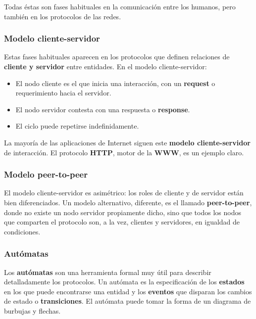 \documentclass[spanish,a4paper,]{article}
\providecommand{\tightlist}{%
  \setlength{\itemsep}{0pt}\setlength{\parskip}{0pt}}
\begin{document}
Todas éstas son fases habituales en la comunicación entre los humanos,
pero también en los protocolos de las redes.

\hypertarget{modelo-cliente-servidor}{%
\subsubsection{Modelo cliente-servidor}\label{modelo-cliente-servidor}}

Estas fases habituales aparecen en los protocolos que definen relaciones
de \textbf{cliente y servidor} entre entidades. En el modelo
cliente-servidor:

\begin{itemize}
\tightlist
\item
  El nodo cliente es el que inicia una interacción, con un
  \textbf{request} o requerimiento hacia el servidor.
\item
  El nodo servidor contesta con una respuesta o \textbf{response}.
\item
  El ciclo puede repetirse indefinidamente.
\end{itemize}

La mayoría de las aplicaciones de Internet siguen este \textbf{modelo
cliente-servidor} de interacción. El protocolo \textbf{HTTP}, motor de
la \textbf{WWW}, es un ejemplo claro.

\hypertarget{modelo-peer-to-peer}{%
\subsubsection{Modelo peer-to-peer}\label{modelo-peer-to-peer}}

El modelo cliente-servidor es asimétrico: los roles de cliente y de
servidor están bien diferenciados. Un modelo alternativo, diferente, es
el llamado \textbf{peer-to-peer}, donde no existe un nodo servidor
propiamente dicho, sino que todos los nodos que comparten el protocolo
son, a la vez, clientes y servidores, en igualdad de condiciones.

\hypertarget{autuxf3matas}{%
\subsubsection{Autómatas}\label{autuxf3matas}}

Los \textbf{autómatas} son una herramienta formal muy útil para
describir detalladamente los protocolos. Un autómata es la
especificación de los \textbf{estados} en los que puede encontrarse una
entidad y los \textbf{eventos} que disparan los cambios de estado o
\textbf{transiciones}. El autómata puede tomar la forma de un diagrama
de burbujas y flechas.
\end{document}
